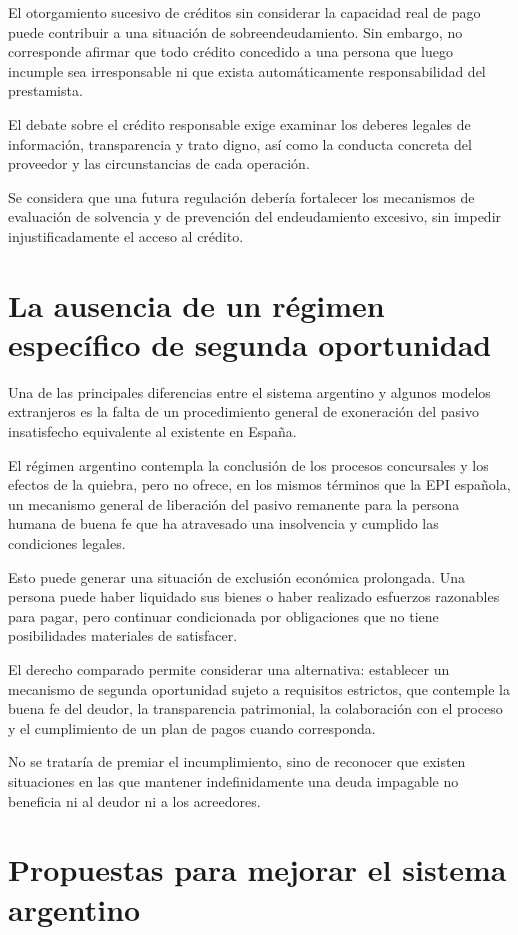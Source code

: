 \documentclass[12pt,oneside]{book}
\begin{document}
El otorgamiento sucesivo de créditos sin considerar la capacidad real de pago puede contribuir a una situación de sobreendeudamiento. Sin embargo, no corresponde afirmar que todo crédito concedido a una persona que luego incumple sea irresponsable ni que exista automáticamente responsabilidad del prestamista.

El debate sobre el crédito responsable exige examinar los deberes legales de información, transparencia y trato digno, así como la conducta concreta del proveedor y las circunstancias de cada operación.

Se considera que una futura regulación debería fortalecer los mecanismos de evaluación de solvencia y de prevención del endeudamiento excesivo, sin impedir injustificadamente el acceso al crédito.

\section{La ausencia de un régimen específico de segunda oportunidad}

Una de las principales diferencias entre el sistema argentino y algunos modelos extranjeros es la falta de un procedimiento general de exoneración del pasivo insatisfecho equivalente al existente en España.

El régimen argentino contempla la conclusión de los procesos concursales y los efectos de la quiebra, pero no ofrece, en los mismos términos que la EPI española, un mecanismo general de liberación del pasivo remanente para la persona humana de buena fe que ha atravesado una insolvencia y cumplido las condiciones legales.

Esto puede generar una situación de exclusión económica prolongada. Una persona puede haber liquidado sus bienes o haber realizado esfuerzos razonables para pagar, pero continuar condicionada por obligaciones que no tiene posibilidades materiales de satisfacer.

El derecho comparado permite considerar una alternativa: establecer un mecanismo de segunda oportunidad sujeto a requisitos estrictos, que contemple la buena fe del deudor, la transparencia patrimonial, la colaboración con el proceso y el cumplimiento de un plan de pagos cuando corresponda.

No se trataría de premiar el incumplimiento, sino de reconocer que existen situaciones en las que mantener indefinidamente una deuda impagable no beneficia ni al deudor ni a los acreedores.

\section{Propuestas para mejorar el sistema argentino}
\end{document}
